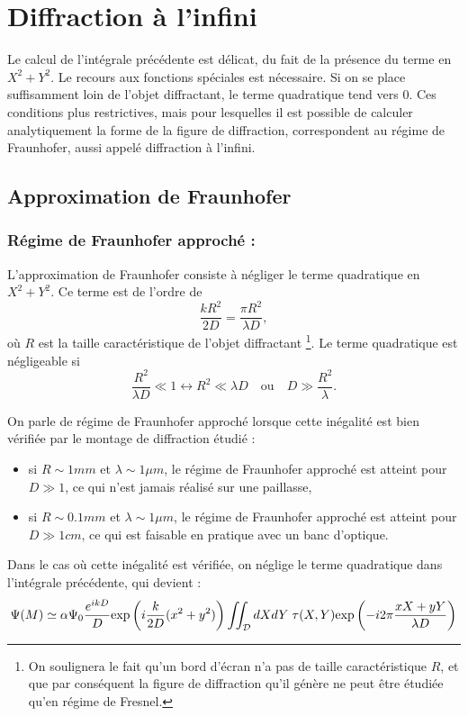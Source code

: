 \documentclass[11pt,a4paper]{report}
\begin{document}
\newpage
\section{Diffraction à l'infini}

Le calcul de l'intégrale précédente est délicat, du fait de la présence du terme en $X^2 + Y^2$. Le recours aux fonctions spéciales est nécessaire. Si on se place suffisamment loin de l'objet diffractant, le terme quadratique tend vers 0. Ces conditions plus restrictives, mais pour lesquelles il est possible de calculer analytiquement la forme de la figure de diffraction, correspondent au régime de Fraunhofer, aussi appelé diffraction à l'infini.
 
\subsection{Approximation de Fraunhofer}

\subsubsection{Régime de Fraunhofer approché :}
L'approximation de Fraunhofer consiste à négliger le terme quadratique en $X^2 + Y^2$. Ce terme est de l'ordre de
\begin{equation}
	\frac{k R^2}{2 D} = \frac{\pi R^2}{\lambda D},
\end{equation}
où $R$ est la taille caractéristique de l'objet diffractant \footnote{On soulignera le fait qu'un bord d'écran n'a pas de taille caractéristique $R$, et que par conséquent la figure de diffraction qu'il génère ne peut être étudiée qu'en régime de Fresnel.}. Le terme quadratique est négligeable si
\begin{equation}
	\frac{R^2}{\lambda D} \ll 1 \leftrightarrow R^2 \ll \lambda D \quad\text{ou}\quad D \gg \frac{R^2}{\lambda}.
\end{equation}

On parle de régime de Fraunhofer approché lorsque cette inégalité est bien vérifiée par le montage de diffraction étudié :
\begin{itemize}
	\item si $R \sim 1 mm$ et $\lambda \sim 1 \mu m$, le régime de Fraunhofer approché est atteint pour $D \gg 1$, ce qui n'est jamais réalisé sur une paillasse,
	\item si $R \sim 0.1 mm$ et $\lambda \sim 1 \mu m$, le régime de Fraunhofer approché est atteint pour $D \gg 1 cm$, ce qui est faisable en pratique avec un banc d'optique.
\end{itemize}
Dans le cas où cette inégalité est vérifiée, on néglige le terme quadratique dans l'intégrale précédente, qui devient :
\begin{equation}
	\Psi(M) \simeq  \alpha \Psi_0 \displaystyle{\frac{e^{ikD}}{D}}\displaystyle{\text{exp}\left(i\frac{k}{2D}(x^2 + y^2) \right)} \iint_\mathcal{D} dXdY\; \tau(X,Y) \displaystyle{\text{exp}\left(-i 2\pi \frac{xX + yY}{\lambda D}\right)}\\
\end{equation}
\end{document}
